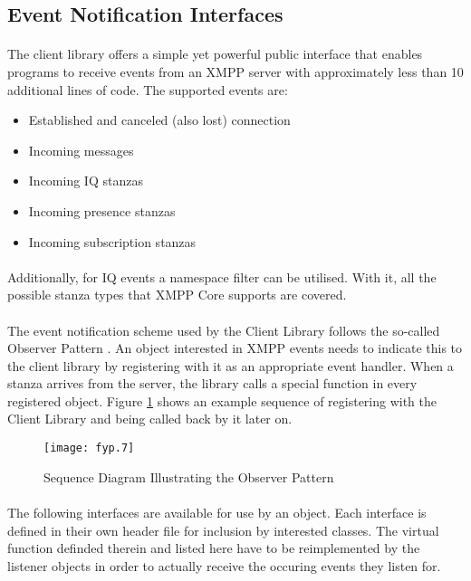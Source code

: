 \subsection{Event Notification Interfaces}
\paragraph{}
The client library offers a simple yet powerful public interface that enables programs to receive events from an XMPP server with approximately less than 10 additional lines of code. The supported events are:
\begin{itemize}
\item Established and canceled (also lost) connection
\item Incoming messages
\item Incoming IQ stanzas
\item Incoming presence stanzas
\item Incoming subscription stanzas
\end{itemize}
\paragraph{}
Additionally, for IQ events a namespace filter can be utilised. With it, all the possible stanza types that XMPP Core supports are covered.

\paragraph{}
The event notification scheme used by the Client Library follows the so-called Observer Pattern \cite{wikipedia003}. An object interested in XMPP events needs to indicate this to the client library by registering with it as an appropriate event handler. When a stanza arrives from the server, the library calls a special function in every registered object. Figure \ref{fig:observer1} shows an example sequence of registering with the Client Library and being called back by it later on.

\begin{figure}[H]
\begin{center}
\texttt{[image: fyp.7]}
\end{center}
\caption{Sequence Diagram Illustrating the Observer Pattern}
\label{fig:observer1}
\end{figure}
\paragraph{}
The following interfaces are available for use by an object. Each interface is defined in their own header file for inclusion by interested classes. The virtual function definded therein and listed here have to be reimplemented by the listener objects in order to actually receive the occuring events they listen for.

